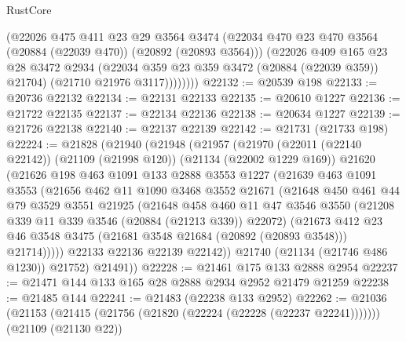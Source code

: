 \begin{lexlean}{RustCore}
\begin{coremodule}
              (@22026
                @475
                @411
                @23
                @29
                @3564
                @3474
                (@22034 @470 @23 @470 @3564 (@20884 (@22039 @470)) (@20892 (@20893 @3564)))
                (@22026
                  @409
                  @165
                  @23
                  @28
                  @3472
                  @2934
                  (@22034 @359 @23 @359 @3472 (@20884 (@22039 @359)) @21704)
                  (@21710 @21976 @3117))))))))
@22132 := @20539 @198
@22133 := @20736 @22132
@22134 := @22131 @22133
@22135 := @20610 @1227
@22136 := @21722 @22135
@22137 := @22134 @22136
@22138 := @20634 @1227
@22139 := @21726 @22138
@22140 := @22137 @22139
@22142 := @21731 (@21733 @198)
@22224 := @21828
    (@21940
      (@21948
        (@21957
          (@21970
            (@22011 (@22140 @22142))
            (@21109 (@21998 @120))
            (@21134 (@22002 @1229 @169))
            @21620
            (@21626
              @198
              @463
              @1091
              @133
              @2888
              @3553
              @1227
              (@21639
                @463
                @1091
                @3553
                (@21656
                  @462
                  @11
                  @1090
                  @3468
                  @3552
                  @21671
                  (@21648
                    @450
                    @461
                    @44
                    @79
                    @3529
                    @3551
                    @21925
                    (@21648
                      @458
                      @460
                      @11
                      @47
                      @3546
                      @3550
                      (@21208 @339 @11 @339 @3546 (@20884 (@21213 @339)) @22072)
                      (@21673
                        @412
                        @23
                        @46
                        @3548
                        @3475
                        (@21681 @3548 @21684 (@20892 (@20893 @3548)))
                        @21714)))))
              @22133
              @22136
              @22139
              @22142))
          @21740
          (@21134 (@21746 @486 @1230))
          @21752)
        @21491))
@22228 := @21461 @175 @133 @2888 @2954
@22237 := @21471 @144 @133 @165 @28 @2888 @2934 @2952 @21479 @21259
@22238 := @21485 @144
@22241 := @21483 (@22238 @133 @2952)
@22262 := @21036
    (@21153 (@21415 (@21756 (@21820 (@22224 (@22228 (@22237 @22241)))))))
    (@21109 (@21130 @22))

\end{coremodule}
\end{lexlean}

